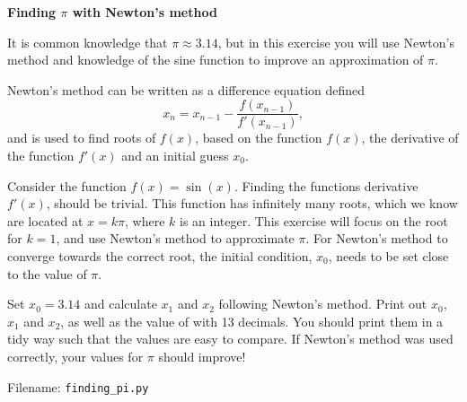 \begin{Problem} \textbf{{Finding $\pi$ with Newton's method}}

\noindent
It is common knowledge that $\pi \approx 3.14$, but in this exercise you will use Newton's method and knowledge of the sine function to improve an approximation of $\pi$.

Newton's method can be written as a difference equation defined \begin{equation*}
    x_n = x_{n - 1} - \frac {f(x_{n-1})} {f'(x_{n-1}) } ,
\end{equation*}
and is used to find roots of $f(x)$, based on the function $f(x)$, the derivative of the function $f'(x)$ and an initial guess $x_0$.  

Consider the function $f(x) = \sin(x)$. Finding the functions derivative $f'(x)$, should be trivial. This function has infinitely many roots, which we know are located at $x = k \pi$, where $k$ is an integer. This exercise will focus on the root for $k = 1$, and use Newton's method to approximate $\pi$. For Newton's method to converge towards the correct root, the initial condition, $x_0$, needs to be set close to the value of $\pi$.  
\bigskip

Set $x_0 = 3.14$ and calculate $x_1$ and $x_2$ following Newton's method. Print out $x_0$, $x_1$ and $x_2$, as well as the value of  with 13 decimals. You should print them in a tidy way such that the values are easy to compare. If Newton's method was used correctly, your values for $\pi$ should improve!


Filename: \texttt{finding\_pi.py}
\end{Problem}


